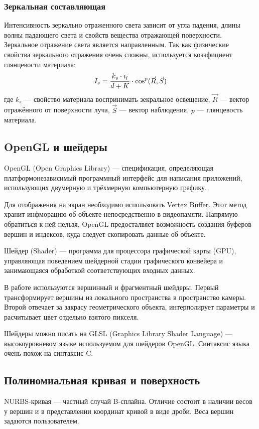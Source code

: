 \subsubsection*{Зеркальная составляющая}
Интенсивность зеркально отраженного света зависит от угла падения, длины волны падающего света и свойств вещества отражающей поверхности. Зеркальное отражение света является направленным. Так как физические свойства зеркального отражения очень сложны, используется коээфициент глянцевости материала:
\begin{equation*}
    I_s = {{k_s \cdot i_l} \over {d + K}} \cdot {\cos ^ p}(\vec{R}, \vec{S})
\end{equation*}
где $k_s$ --- свойство материала воспринимать зекральное освещение, $\vec{R}$ --- вектор отражённого от поверхности луча, $\vec{S}$ --- вектор наблюдения, $p$ --- глянцевость материала.

\subsection*{OpenGL и шейдеры}
OpenGL (Open Graphics Library) --- спецификация, определяющая платформонезависимый программный интерфейс для написания приложений, использующих двумерную и трёхмерную компьютерную графику.

Для отображения на экран необходимо использовать Vertex Buffer. Этот метод хранит инфморацию об объекте непосредственно в видеопамяти. Напрямую обратиться к ней нельзя, OpenGL предосталвяет возможность создания буферов вершин и индексов, куда следует скопировать данные об объекте.

Шейдер (Shader) --- программа для процессора графической карты (GPU), управляющая поведением шейдерной стадии графического конвейера и занимающаяся обработкой соответствующих входных данных.

В работе используются вершинный и фрагментный шейдеры. Первый трансформирует вершины из локального пространства в пространство камеры. Второй отвечает за закрасу геометрического объекта, интерполирует параметры и расчитывает цвет отдельно взятого пикселя.

Шейдеры можно писать на GLSL (Graphics Library Shader Language) --- высокоуровневом языке используемом для шейдеров OpenGL. Синтаксис языка очень похож на синтаксис C.
\pagebreak

\subsection*{Полиномиальная кривая и поверхность}
NURBS-кривая --- частный случай B-сплайна. Отличие состоит в наличии весов у вершин и в представлении координат кривой в виде дроби.
Веса вершин задаются пользователем.

